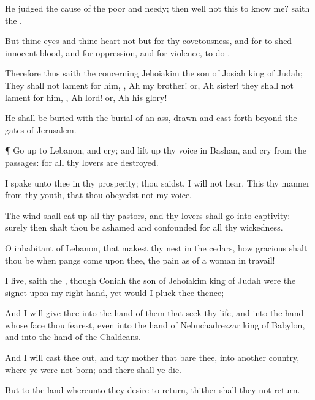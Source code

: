 {He
judged the
cause of the
poor and
needy; then
{}
well
{} not this to
know me?
saith the
{}.

But thine
eyes and thine
heart
{} not but for thy
covetousness, and for to
shed
innocent
blood, and for
oppression, and for
violence, to
do
{}.

Therefore thus
saith the
{} concerning
Jehoiakim the
son of
Josiah
king of
Judah; They shall not
lament for him,
{},
Ah my
brother! or,
Ah
sister! they shall not
lament for him,
{},
Ah
lord! or,
Ah his
glory!

He shall be
buried with the
burial of an
ass,
drawn and cast
forth
beyond the
gates of
Jerusalem.


\par }{\PP {}¶ Go
up to
Lebanon, and
cry; and lift
up thy
voice in
Bashan, and
cry from the
passages: for all thy
lovers are
destroyed.

I
spake unto thee in thy
prosperity;
{} thou
saidst, I will not
hear. This
{} thy
manner from thy
youth, that thou
obeyedst not my
voice.

The
wind shall eat
up all thy
pastors, and thy
lovers shall
go into
captivity: surely then shalt thou be
ashamed and
confounded for all thy
wickedness.

O
inhabitant of
Lebanon, that makest thy
nest in the
cedars, how
gracious shalt thou be when
pangs
come upon thee, the
pain as of a woman in
travail!

 I
live,
saith the
{}, though
Coniah the
son of
Jehoiakim
king of
Judah were the
signet upon my
right
hand, yet would I
pluck thee thence;

And I will
give thee into the
hand of them that
seek thy
life, and into the
hand
{} whose
face thou
fearest, even into the
hand of
Nebuchadrezzar
king of
Babylon, and into the
hand of the
Chaldeans.

And I will cast thee
out, and thy
mother that
bare thee, into
another
country, where ye were not
born; and there shall ye
die.

But to the
land whereunto they
desire to
return, thither shall they not
return.

}
